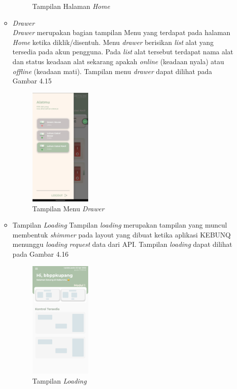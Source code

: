 \begin{flushleft}
\begin{justify}
\begin{enumerate}
\begin{itemize}
\begin{figure}[ht]
                    \caption{Tampilan Halaman \emph{Home}}
                \end{figure}
                \newline
                \item \emph{Drawer}\\
                \emph{Drawer} merupakan bagian tampilan Menu yang terdapat pada halaman \emph{Home} ketika diklik/disentuh. Menu \emph{drawer} berisikan \emph{list} alat yang tersedia pada akun pengguna. Pada \emph{list} alat tersebut terdapat nama alat dan status keadaan alat sekarang apakah \emph{online} (keadaan nyala) atau \emph{offline} (keadaan mati).
                Tampilan menu \emph{drawer} dapat dilihat pada Gambar 4.15
                \begin{figure}[ht]
                    \centering
                    \includegraphics[width=3cm]{images/bab 4/drawerr.jpeg}
                    \caption{Tampilan Menu \emph{Drawer}}
                \end{figure}
                \item Tampilan \emph{Loading}
                Tampilan \emph{loading} merupakan tampilan yang muncul membentuk \emph{shimmer} pada layout yang dibuat ketika aplikasi KEBUNQ menunggu \emph{loading request} data dari API.
                Tampilan \emph{loading} dapat dilihat pada Gambar 4.16 
                \begin{figure}[ht]
                    \centering
                    \includegraphics[width=3cm]{images/bab 4/ui-loading.png}
                    \caption{Tampilan \emph{Loading}}
                \end{figure}


\end{itemize}
\end{enumerate}
\end{justify}
\end{flushleft}
